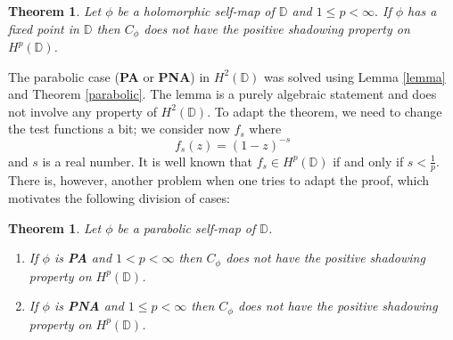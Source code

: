 \documentclass[11pt]{amsart}
\theoremstyle{plain}
\newtheorem{theorem}[definition]{Theorem}
\theoremstyle{remark}
\theoremstyle{plain}
\begin{document}
\begin{theorem}
Let $\phi$ be a holomorphic self-map of $\mathbb{D}$ and $1 \leq p < \infty.$ If $\phi$ has a fixed point in $\mathbb{D}$ then $C_{\phi}$ does not have the positive shadowing property on  $H^p(\mathbb{D})$.
\end{theorem}

The parabolic case (\textbf{PA} or \textbf{PNA}) in $H^2(\mathbb{D})$ was solved using Lemma \ref{lemma} and Theorem \ref{parabolic}. The lemma is a purely algebraic statement and does not involve any property of $H^2(\mathbb{D})$. To adapt the theorem, we need to change the test functions a bit; we consider now  $f_{s}$ where $$f_{s}(z) = (1 - z)^{-s}$$
and $s$ is a real number. It is well known that $f_{s} \in H^p(\mathbb{D})$ if and only if $s < \frac{1}{p}$. There is, however, another problem when one tries to adapt the proof, which motivates the following division of cases:


\begin{theorem}\label{Teo para H^p's} Let $\phi$ be a parabolic self-map of $\mathbb{D}$.
\begin{enumerate}[label=(\arabic*), font=\normalfont]
    \item If $\phi$ is \textbf{PA} and $1 < p < \infty$ then $C_{\phi}$ does not have the positive shadowing property on $H^p(\mathbb{D})$.
    \item If $\phi$ is \textbf{PNA} and $1 \leq p < \infty$ then $C_{\phi}$ does not have the positive shadowing property on $H^p(\mathbb{D})$.
\end{enumerate}
\end{theorem}
\end{document}

